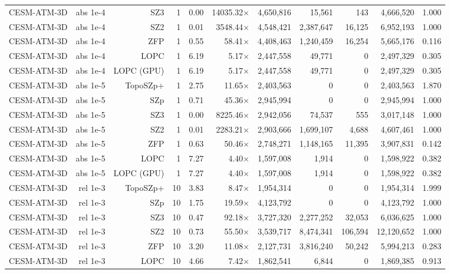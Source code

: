 \begin{tabular}{lrrrrrrrrrr}
CESM-ATM-3D & abs 1e-4 & SZ3 & 1 & 0.00 & 14035.32$\times$ & 4,650,816 & 15,561 & 143 & 4,666,520 & 1.000 \\
CESM-ATM-3D & abs 1e-4 & SZ2 & 1 & 0.01 & 3548.44$\times$ & 4,548,421 & 2,387,647 & 16,125 & 6,952,193 & 1.000 \\
CESM-ATM-3D & abs 1e-4 & ZFP & 1 & 0.55 & 58.41$\times$ & 4,408,463 & 1,240,459 & 16,254 & 5,665,176 & 0.116 \\
CESM-ATM-3D & abs 1e-4 & LOPC & 1 & 6.19 & 5.17$\times$ & 2,447,558 & 49,771 & 0 & 2,497,329 & 0.305 \\
CESM-ATM-3D & abs 1e-4 & LOPC (GPU) & 1 & 6.19 & 5.17$\times$ & 2,447,558 & 49,771 & 0 & 2,497,329 & 0.305 \\
CESM-ATM-3D & abs 1e-5 & TopoSZp+ & 1 & 2.75 & 11.65$\times$ & 2,403,563 & 0 & 0 & 2,403,563 & 1.870 \\
CESM-ATM-3D & abs 1e-5 & SZp & 1 & 0.71 & 45.36$\times$ & 2,945,994 & 0 & 0 & 2,945,994 & 1.000 \\
CESM-ATM-3D & abs 1e-5 & SZ3 & 1 & 0.00 & 8225.46$\times$ & 2,942,056 & 74,537 & 555 & 3,017,148 & 1.000 \\
CESM-ATM-3D & abs 1e-5 & SZ2 & 1 & 0.01 & 2283.21$\times$ & 2,903,666 & 1,699,107 & 4,688 & 4,607,461 & 1.000 \\
CESM-ATM-3D & abs 1e-5 & ZFP & 1 & 0.63 & 50.46$\times$ & 2,748,271 & 1,148,165 & 11,395 & 3,907,831 & 0.142 \\
CESM-ATM-3D & abs 1e-5 & LOPC & 1 & 7.27 & 4.40$\times$ & 1,597,008 & 1,914 & 0 & 1,598,922 & 0.382 \\
CESM-ATM-3D & abs 1e-5 & LOPC (GPU) & 1 & 7.27 & 4.40$\times$ & 1,597,008 & 1,914 & 0 & 1,598,922 & 0.382 \\
CESM-ATM-3D & rel 1e-3 & TopoSZp+ & 10 & 3.83 & 8.47$\times$ & 1,954,314 & 0 & 0 & 1,954,314 & 1.999 \\
CESM-ATM-3D & rel 1e-3 & SZp & 10 & 1.75 & 19.59$\times$ & 4,123,792 & 0 & 0 & 4,123,792 & 1.000 \\
CESM-ATM-3D & rel 1e-3 & SZ3 & 10 & 0.47 & 92.18$\times$ & 3,727,320 & 2,277,252 & 32,053 & 6,036,625 & 1.000 \\
CESM-ATM-3D & rel 1e-3 & SZ2 & 10 & 0.73 & 55.50$\times$ & 3,539,717 & 8,474,341 & 106,594 & 12,120,652 & 1.000 \\
CESM-ATM-3D & rel 1e-3 & ZFP & 10 & 3.20 & 11.08$\times$ & 2,127,731 & 3,816,240 & 50,242 & 5,994,213 & 0.283 \\
CESM-ATM-3D & rel 1e-3 & LOPC & 10 & 4.66 & 7.42$\times$ & 1,862,541 & 6,844 & 0 & 1,869,385 & 0.913 \\

\end{tabular}
